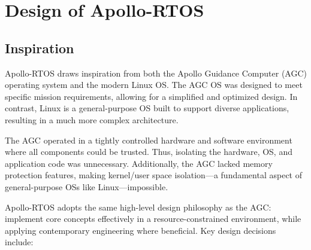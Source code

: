 \section{Design of Apollo-RTOS}
\label{sec:design}

\subsection{Inspiration}

Apollo-RTOS draws inspiration from both the Apollo Guidance Computer (AGC) operating
system and the modern Linux OS. The AGC OS was designed to meet specific mission
requirements, allowing for a simplified and optimized design. In contrast, Linux is a
general-purpose OS built to support diverse applications, resulting in a much more
complex architecture.

The AGC operated in a tightly controlled hardware and software environment where all
components could be trusted. Thus, isolating the hardware, OS, and application code
was unnecessary. Additionally, the AGC lacked memory protection features, making
kernel/user space isolation---a fundamental aspect of general-purpose OSs like
Linux---impossible.

Apollo-RTOS adopts the same high-level design philosophy as the AGC: implement core
concepts effectively in a resource-constrained environment, while applying
contemporary engineering where beneficial. Key design decisions include:

